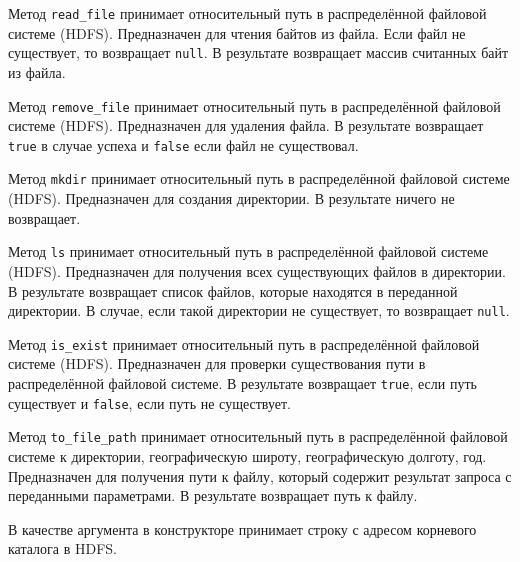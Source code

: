 Метод \texttt{read\_file} принимает относительный путь в распределённой файловой системе (HDFS).
Предназначен для чтения байтов из файла.
Если файл не существует, то возвращает \texttt{null}.
В результате возвращает массив считанных байт из файла.

Метод \texttt{remove\_file} принимает относительный путь в распределённой файловой системе (HDFS).
Предназначен для удаления файла.
В результате возвращает \texttt{true} в случае успеха и \texttt{false} если файл не существовал.

Метод \texttt{mkdir} принимает относительный путь в распределённой файловой системе (HDFS).
Предназначен для создания директории. 
В результате ничего не возвращает.

Метод \texttt{ls} принимает относительный путь в распределённой файловой системе (HDFS).
Предназначен для получения всех существующих файлов в директории.
В результате возвращает список файлов, которые находятся в переданной директории.
В случае, если такой директории не существует, то возвращает \texttt{null}.

Метод \texttt{is\_exist} принимает относительный путь в распределённой файловой системе (HDFS).
Предназначен для проверки существования пути в распределённой файловой системе.
В результате возвращает \texttt{true}, если путь существует и \texttt{false}, если путь не существует.

Метод \texttt{to\_file\_path} принимает относительный путь в распределённой файловой системе к директории, географическую широту, географическую долготу, год.
Предназначен для получения пути к файлу, который содержит результат запроса с переданными параметрами.
В результате возвращает путь к файлу.


В качестве аргумента в конструкторе принимает строку с адресом корневого каталога в HDFS.

